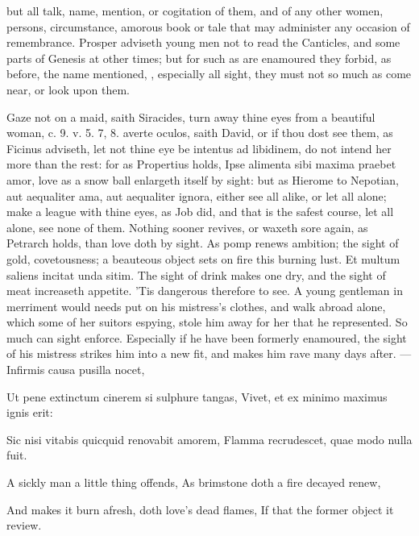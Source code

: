 but all talk, name, mention, or cogitation of them, and of any other
women, persons, circumstance, amorous book or tale that may administer
any occasion of remembrance. Prosper adviseth young men not to
read the Canticles, and some parts of Genesis at other times; but for
such as are enamoured they forbid, as before, the name mentioned, \etc{},
especially all sight, they must not so much as come near, or look upon
them.

Gaze not on a maid, saith Siracides, turn away thine eyes from a
beautiful woman, c. 9. v. 5. 7, 8. averte oculos, saith David, or if
thou dost see them, as Ficinus adviseth, let not thine eye be intentus
ad libidinem, do not intend her more than the rest: for as
Propertius holds, Ipse alimenta sibi maxima praebet amor, love as
a snow ball enlargeth itself by sight: but as Hierome to Nepotian, aut
aequaliter ama, aut aequaliter ignora, either see all alike, or let all
alone; make a league with thine eyes, as Job did, and that is the
safest course, let all alone, see none of them. Nothing sooner revives,
or waxeth sore again, as Petrarch holds, than love doth by sight.
As pomp renews ambition; the sight of gold, covetousness; a beauteous
object sets on fire this burning lust. Et multum saliens incitat unda
sitim. The sight of drink makes one dry, and the sight of meat
increaseth appetite. 'Tis dangerous therefore to see. A young
gentleman in merriment would needs put on his mistress's clothes, and
walk abroad alone, which some of her suitors espying, stole him away
for her that he represented. So much can sight enforce. Especially if
he have been formerly enamoured, the sight of his mistress strikes him
into a new fit, and makes him rave many days after.
---Infirmis causa pusilla nocet,

Ut pene extinctum cinerem si sulphure tangas,
Vivet, et ex minimo maximus ignis erit:

Sic nisi vitabis quicquid renovabit amorem,
Flamma recrudescet, quae modo nulla fuit.


A sickly man a little thing offends,
As brimstone doth a fire decayed renew,

And makes it burn afresh, doth love's dead flames,
If that the former object it review.

